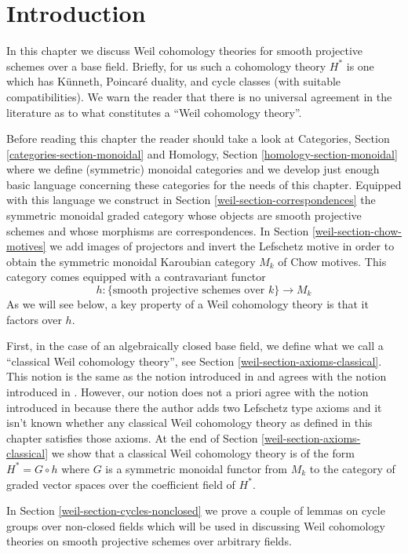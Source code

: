 \section{Introduction}
\label{weil-section-introduction}
In this chapter we discuss Weil cohomology theories for smooth
projective schemes over a base field. Briefly, for us such a cohomology
theory $H^*$ is one which has K\"unneth, Poincar\'e duality,
and cycle classes (with suitable compatibilities). We warn the reader that
there is no universal agreement in the literature as to what
constitutes a ``Weil cohomology theory''.

\medskip\noindent
Before reading this chapter the reader should take a look at
Categories, Section \ref{categories-section-monoidal} and
Homology, Section \ref{homology-section-monoidal} where
we define (symmetric) monoidal categories and we develop just enough
basic language concerning these categories for the needs of this chapter.
Equipped with this language we construct in
Section \ref{weil-section-correspondences} the symmetric monoidal
graded category whose objects are smooth projective schemes and
whose morphisms are correspondences. In Section \ref{weil-section-chow-motives}
we add images of projectors and invert the Lefschetz motive in
order to obtain the symmetric monoidal Karoubian category $M_k$
of Chow motives. This category comes equipped with a contravariant functor
$$
h : \{\text{smooth projective schemes over }k\} \longrightarrow M_k
$$
As we will see below, a key property of a Weil cohomology theory is
that it factors over $h$.

\medskip\noindent
First, in the case of an algebraically closed base field, we define
what we call a ``classical Weil cohomology theory'',
see Section \ref{weil-section-axioms-classical}. This notion is the
same as the notion introduced in \cite[Section 1.2]{Kleiman-cycles} and
agrees with the notion introduced in \cite[page 65]{Kleiman-motives}.
However, our notion does not a priori agree with the notion introduced in
\cite[page 10]{Kleiman-standard} because there the author adds two Lefschetz
type axioms and it isn't known whether any classical Weil cohomology
theory as defined in this chapter satisfies those axioms.
At the end of Section \ref{weil-section-axioms-classical} we show that
a classical Weil cohomology theory is of the form $H^* = G \circ h$
where $G$ is a symmetric monoidal functor from $M_k$ to the category
of graded vector spaces over the coefficient field of $H^*$.

\medskip\noindent
In Section \ref{weil-section-cycles-nonclosed} we prove a couple of lemmas
on cycle groups over non-closed fields which will be used in discussing
Weil cohomology theories on smooth projective schemes over arbitrary fields.


